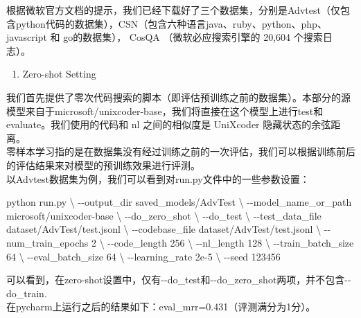 \documentclass[
]{article}
\newenvironment{Shaded}{}{}
\newcommand{\AttributeTok}[1]{\textcolor[rgb]{0.49,0.56,0.16}{#1}}
\newcommand{\DataTypeTok}[1]{\textcolor[rgb]{0.56,0.13,0.00}{#1}}
\newcommand{\ExtensionTok}[1]{#1}
\newcommand{\NormalTok}[1]{#1}
\begin{document}
根据微软官方文档的提示，我们已经下载好了三个数据集，分别是Advtest（仅包含python代码的数据集），CSN（包含六种语言java、ruby、python、php、javascript
和 go的数据集）， CosQA （微软必应搜索引擎的 20,604 个搜索日志）。

\begin{enumerate}
  \def\labelenumi{\arabic{enumi}.}
  \item
        Zero-shot Setting
\end{enumerate}

我们首先提供了零次代码搜索的脚本（即评估预训练之前的数据集）。本部分的源模型来自于microsoft/unixcoder-base，我们将直接在这个模型上进行test和evaluate。我们使用的代码和
nl 之间的相似度是 UniXcoder 隐藏状态的余弦距离。\\
零样本学习指的是在数据集没有经过训练之前的一次评估，我们可以根据训练前后的评估结果来对模型的预训练效果进行评测。\\
以Advtest数据集为例，我们可以看到对run.py文件中的一些参数设置：

\begin{Shaded}
  \begin{Highlighting}[]
    \ExtensionTok{python}\NormalTok{ run.py }\DataTypeTok{\textbackslash{}}
    \AttributeTok{{-}{-}output\_dir}\NormalTok{ saved\_models/AdvTest }\DataTypeTok{\textbackslash{}}
    \AttributeTok{{-}{-}model\_name\_or\_path}\NormalTok{ microsoft/unixcoder{-}base  }\DataTypeTok{\textbackslash{}}
    \AttributeTok{{-}{-}do\_zero\_shot} \DataTypeTok{\textbackslash{}}
    \AttributeTok{{-}{-}do\_test} \DataTypeTok{\textbackslash{}}
    \AttributeTok{{-}{-}test\_data\_file}\NormalTok{ dataset/AdvTest/test.jsonl }\DataTypeTok{\textbackslash{}}
    \AttributeTok{{-}{-}codebase\_file}\NormalTok{ dataset/AdvTest/test.jsonl }\DataTypeTok{\textbackslash{}}
    \AttributeTok{{-}{-}num\_train\_epochs}\NormalTok{ 2 }\DataTypeTok{\textbackslash{}}
    \AttributeTok{{-}{-}code\_length}\NormalTok{ 256 }\DataTypeTok{\textbackslash{}}
    \AttributeTok{{-}{-}nl\_length}\NormalTok{ 128 }\DataTypeTok{\textbackslash{}}
    \AttributeTok{{-}{-}train\_batch\_size}\NormalTok{ 64 }\DataTypeTok{\textbackslash{}}
    \AttributeTok{{-}{-}eval\_batch\_size}\NormalTok{ 64 }\DataTypeTok{\textbackslash{}}
    \AttributeTok{{-}{-}learning\_rate}\NormalTok{ 2e{-}5 }\DataTypeTok{\textbackslash{}}
    \AttributeTok{{-}{-}seed}\NormalTok{ 123456}
  \end{Highlighting}
\end{Shaded}

可以看到，在zero-shot设置中，仅有-\/-do\_test和-\/-do\_zero\_shot两项，并不包含-\/-do\_train.\\
在pycharm上运行之后的结果如下：eval\_mrr=0.431（评测满分为1分）。
\end{document}
